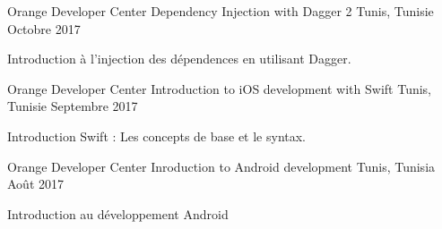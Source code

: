 

\begin{cventries}
	
	\cventry
		{Orange Developer Center} %
		{Dependency Injection with Dagger 2} %
		{Tunis, Tunisie} %
		{Octobre 2017} %
		{
			\begin{cvitems} %
				\item {Introduction à l'injection des dépendences en utilisant Dagger.}
			\end{cvitems}
		}

  \cventry
    {Orange Developer Center} %
    {Introduction to iOS development with Swift} %
    {Tunis, Tunisie} %
    {Septembre 2017} %
    {
      \begin{cvitems} %
        \item {Introduction Swift : Les concepts de base et le syntax.}
      \end{cvitems}
    }
	
	\cventry
		{Orange Developer Center} %
		{Inroduction to Android development} %
		{Tunis, Tunisia} %
		{Août 2017} %
		{
			\begin{cvitems} %
				\item {Introduction au développement Android}
			\end{cvitems}
		}

\end{cventries}
